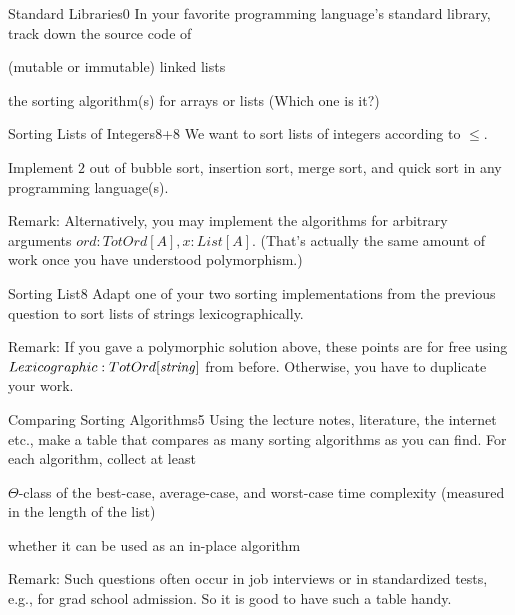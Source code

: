 \documentclass[a4paper]{article}
\begin{document}
\header

\begin{problem}{Standard Libraries}{0}
In your favorite programming language's standard library, track down the source code of
\begin{compactitem}
 \item (mutable or immutable) linked lists
 \item the sorting algorithm(s) for arrays or lists (Which one is it?)
\end{compactitem}
\end{problem}

\begin{problem}{Sorting Lists of Integers}{8+8}
We want to sort lists of integers according to $\leq$.

Implement $2$ out of bubble sort, insertion sort, merge sort, and quick sort in any programming language(s).
\medskip

Remark: Alternatively, you may implement the algorithms for arbitrary arguments $ord:TotOrd[A], x:List[A]$.
(That's actually the same amount of work once you have understood polymorphism.)
\end{problem}

\begin{problem}{Sorting List}{8}
Adapt one of your two sorting implementations from the previous question to sort lists of strings lexicographically.
\medskip

Remark: If you gave a polymorphic solution above, these points are for free using $Lexicographic:TotOrd[\mathit{string}]$ from before.
Otherwise, you have to duplicate your work.
\end{problem}

\begin{problem}{Comparing Sorting Algorithms}{5}
Using the lecture notes, literature, the internet etc., make a table that compares as many sorting algorithms as you can find.
For each algorithm, collect at least
\begin{compactitem}
 \item $\Theta$-class of the best-case, average-case, and worst-case time complexity (measured in the length of the list)
 \item whether it can be used as an in-place algorithm
\end{compactitem}
\medskip

Remark: Such questions often occur in job interviews or in standardized tests, e.g., for grad school admission.
So it is good to have such a table handy.
\end{problem}
\end{document}
